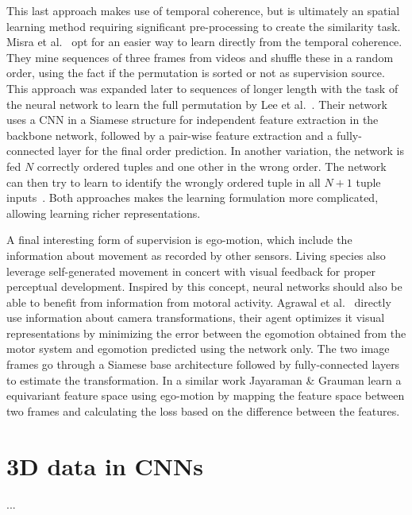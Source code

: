 This last approach makes use of temporal coherence, but is ultimately an spatial learning method requiring significant pre-processing to create the similarity task. Misra et al.~\cite{misra2016} opt for an easier way to learn directly from the temporal coherence. They mine sequences of three frames from videos and shuffle these in a random order, using the fact if the permutation is sorted or not as supervision source. This approach was expanded later to sequences of longer length with the task of the neural network to learn the full permutation by Lee et al.~\cite{lee2017}. Their network uses a CNN in a Siamese structure for independent feature extraction in the backbone network, followed by a pair-wise feature extraction and a fully-connected layer for the final order prediction. In another variation, the network is fed $N$ correctly ordered tuples and one other in the wrong order. The network can then try to learn to identify the wrongly ordered tuple in all $N+1$ tuple inputs~\cite{fernando2017}. Both approaches makes the learning formulation more complicated, allowing learning richer representations\needref. 

A final interesting form of supervision is ego-motion, which include the information about movement as recorded by other sensors. Living species also leverage self-generated movement in concert with visual feedback for proper perceptual development. Inspired by this concept, neural networks should also be able to benefit from information from motoral activity. Agrawal et al.~\cite{agrawal2015} directly use information about camera transformations, their agent optimizes it visual representations by minimizing the error between the egomotion obtained from the motor system and egomotion predicted using the network only. The two image frames go through a Siamese base architecture followed by fully-connected layers to estimate the transformation. In a similar work Jayaraman \& Grauman learn a equivariant feature space using ego-motion by mapping the feature space between two frames and calculating the loss based on the difference between the features.

\section{3D data in CNNs}
...
